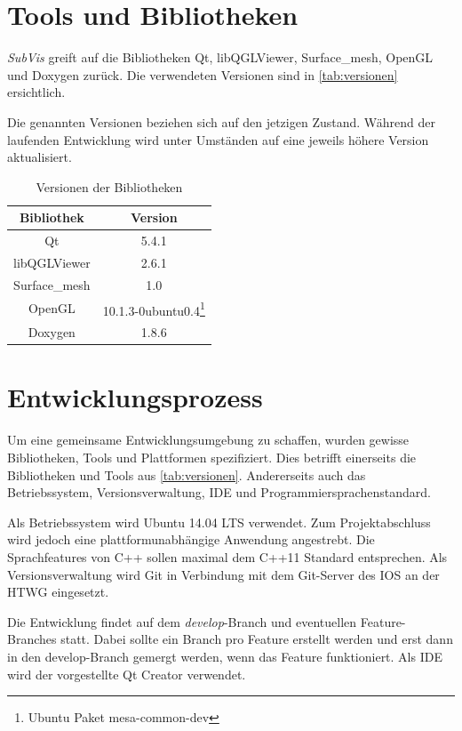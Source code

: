 \section{Tools und Bibliotheken}

\emph{SubVis} greift auf die Bibliotheken Qt, libQGLViewer, Surface\_mesh, OpenGL und Doxygen zurück.
Die verwendeten Versionen sind in \autoref{tab:versionen} ersichtlich.

Die genannten Versionen beziehen sich auf den jetzigen Zustand. 
Während der laufenden Entwicklung wird unter Umständen auf eine jeweils höhere Version aktualisiert.

\begin{table}[h]
\center
\caption{Versionen der Bibliotheken}
\label{tab:versionen}
\begin{tabular}{c|c}
Bibliothek & Version\\
\hline
Qt & 5.4.1\\
libQGLViewer & 2.6.1\\
Surface\_mesh & 1.0\\
OpenGL & 10.1.3-0ubuntu0.4\footnote{Ubuntu Paket mesa-common-dev}\\
Doxygen & 1.8.6\\
\end{tabular}
\end{table}

\section{Entwicklungsprozess}

Um eine gemeinsame Entwicklungsumgebung zu schaffen, wurden gewisse Bibliotheken, Tools und Plattformen spezifiziert.
Dies betrifft einerseits die Bibliotheken und Tools aus \autoref{tab:versionen}.
Andererseits auch das Betriebssystem, Versionsverwaltung, IDE und Programmiersprachenstandard.

Als Betriebssystem wird Ubuntu 14.04 LTS verwendet. 
Zum Projektabschluss wird jedoch eine plattformunabhängige Anwendung angestrebt.
Die Sprachfeatures von C++ sollen maximal dem C++11 Standard entsprechen.
Als Versionsverwaltung wird Git in Verbindung mit dem Git-Server des IOS an der HTWG eingesetzt. 

Die Entwicklung findet auf dem \emph{develop}-Branch und eventuellen  Feature-Branches statt.
Dabei sollte ein Branch pro Feature erstellt werden und erst dann in den develop-Branch gemergt werden, wenn das Feature funktioniert.
Als IDE wird der vorgestellte Qt Creator verwendet.


